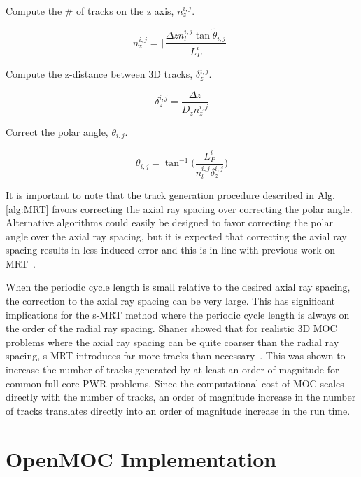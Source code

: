 \begin{algorithm*}[!h]
\begin{algorithmic}
		\State Compute the \# of tracks on the z axis, $n_z^{i,j}$.
		
		\begin{equation}
		n_z^{i,j} = \Bigg\lceil\frac{\Delta z n_l^{i,j} \tan{\tilde{\theta}_{i,j}}}{L_P^i} \Bigg\rceil
		\nonumber
		\end{equation}
		
		\State Compute the z-distance between 3D tracks, $\delta_z^{i,j}$.
		
		\begin{equation}
		\delta_z^{i,j} = \frac{\Delta z}{D_z n_z^{i,j}}
		\nonumber
		\end{equation}
		
		\State Correct the polar angle, $\theta_{i,j}$.
		
		\begin{equation}
		\theta_{i,j} = \tan^{-1} \bigg( \frac{L_P^i}{n_l^{i,j} \delta_z^{i,j}}\bigg)
		\nonumber
		\end{equation}
		
		\EndFor
		\EndFor
	\end{algorithmic}
\end{algorithm*}

It is important to note that the track generation procedure described in Alg. \ref{alg:MRT} favors correcting the axial ray spacing over correcting the polar angle. Alternative algorithms could easily be designed to favor correcting the polar angle over the axial ray spacing, but it is expected that correcting the axial ray spacing results in less induced error and this is in line with previous work on \ac{MRT}~\cite{kochunas}. 

When the periodic cycle length is small relative to the desired axial ray spacing, the correction to the axial ray spacing can be very large. This has significant implications for the \ac{s-MRT} method where the periodic cycle length is always on the order of the radial ray spacing. Shaner showed that for realistic 3D \ac{MOC} problems where the axial ray spacing can be quite coarser than the radial ray spacing, \ac{s-MRT} introduces far more tracks than necessary~\cite{shaner-laydown}. This was shown to increase the number of tracks generated by at least an order of magnitude for common full-core PWR problems. Since the computational cost of \ac{MOC} scales directly with the number of tracks, an order of magnitude increase in the number of tracks translates directly into an order of magnitude increase in the run time.

\section{OpenMOC Implementation}
\label{sec:openmoc-laydown}

